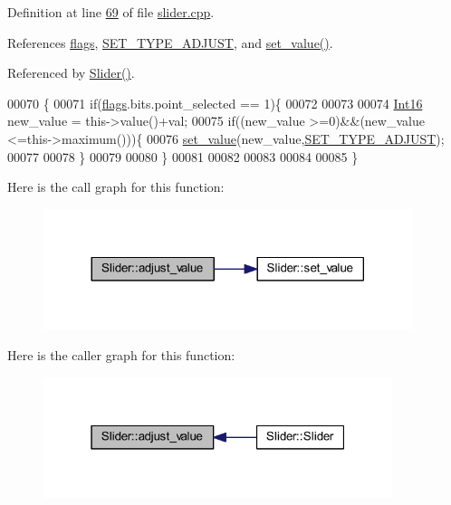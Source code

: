 Definition at line \hyperlink{a00046_source_l00069}{69} of file \hyperlink{a00046_source}{slider.\+cpp}.



References \hyperlink{a00024_ade6449558d429b66e5ed1381bc9b9060}{flags}, \hyperlink{a00034_source_l00049}{S\+E\+T\+\_\+\+T\+Y\+P\+E\+\_\+\+A\+D\+J\+U\+S\+T}, and \hyperlink{a00046_source_l00102}{set\+\_\+value()}.



Referenced by \hyperlink{a00046_source_l00014}{Slider()}.


\begin{DoxyCode}
00070 \{
00071     \textcolor{keywordflow}{if}(\hyperlink{a00024_ade6449558d429b66e5ed1381bc9b9060}{flags}.bits.point\_selected == 1)\{
00072 
00073 
00074     \hyperlink{a00001_a3985266aecb120f269789241c170850c}{Int16} new\_value = this->value()+val;
00075     \textcolor{keywordflow}{if}((new\_value >=0)&&(new\_value <=this->maximum()))\{
00076         \hyperlink{a00024_ae3010d3de02715db2f443560d7d2a27b}{set\_value}(new\_value,\hyperlink{a00034_a16b6b7b5ad68ec0dd62a3c9e97f88adb}{SET\_TYPE\_ADJUST});
00077 
00078     \}
00079 
00080     \}
00081 
00082 
00083 
00084 
00085 \}
\end{DoxyCode}


Here is the call graph for this function\+:
\nopagebreak
\begin{figure}[H]
\begin{center}
\leavevmode
\includegraphics[width=305pt]{dc/de2/a00024_a521ac5143857dd652a0bafa77389fa81_cgraph}
\end{center}
\end{figure}




Here is the caller graph for this function\+:
\nopagebreak
\begin{figure}[H]
\begin{center}
\leavevmode
\includegraphics[width=289pt]{dc/de2/a00024_a521ac5143857dd652a0bafa77389fa81_icgraph}
\end{center}
\end{figure}


